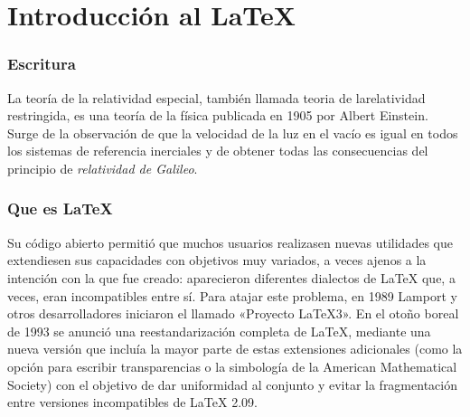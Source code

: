 \part{Introducción al \LaTeX}
\section{Escritura}\label{introduccion}
La teoría de la relatividad especial, también llamada teoria de la\linebreak relatividad restringida, es una teoría de la física publicada en 1905 por Albert Einstein. Surge de la observación de que la velocidad de la luz en el vacío es igual en todos los sistemas de referencia inerciales y de obtener todas las consecuencias del principio de {\it \large relatividad de Galileo}. 

\section{Que es \LaTeX}
Su código abierto permitió que muchos usuarios realizasen nuevas utilidades que extendiesen sus capacidades con objetivos muy variados, a veces ajenos a la intención con la que fue creado: aparecieron diferentes dialectos de LaTeX que, a veces, eran incompatibles entre sí. Para atajar este problema, en 1989 Lamport y otros desarrolladores iniciaron el llamado «Proyecto LaTeX3». En el otoño boreal de 1993 se anunció una reestandarización completa de LaTeX, mediante una nueva versión que incluía la mayor parte de estas extensiones adicionales (como la opción para escribir transparencias o la simbología de la American Mathematical Society) con el objetivo de dar uniformidad al conjunto y evitar la fragmentación entre versiones incompatibles de LaTeX 2.09.


